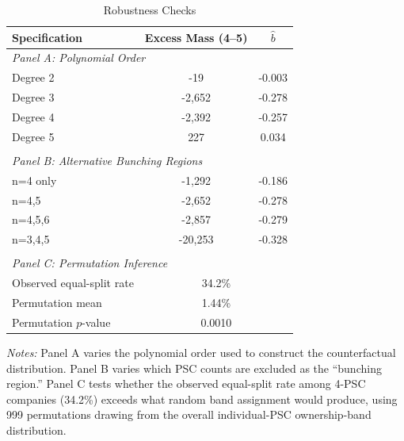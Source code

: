 \begin{table}[t]
\centering
\begin{threeparttable}
\caption{Robustness Checks}
\label{tab:robust}
\begin{tabular}{lcc}
\toprule
Specification & Excess Mass (4--5) & $\hat{b}$ \\
\midrule
\multicolumn{3}{l}{\textit{Panel A: Polynomial Order}} \\[3pt]
\quad Degree 2 & -19 & -0.003 \\
\quad Degree 3 & -2,652 & -0.278 \\
\quad Degree 4 & -2,392 & -0.257 \\
\quad Degree 5 & 227 & 0.034 \\
\\
\multicolumn{3}{l}{\textit{Panel B: Alternative Bunching Regions}} \\[3pt]
\quad n=4 only & -1,292 & -0.186 \\
\quad n=4,5 & -2,652 & -0.278 \\
\quad n=4,5,6 & -2,857 & -0.279 \\
\quad n=3,4,5 & -20,253 & -0.328 \\
\\
\multicolumn{3}{l}{\textit{Panel C: Permutation Inference}} \\[3pt]
\quad Observed equal-split rate & \multicolumn{2}{c}{34.2\%} \\
\quad Permutation mean & \multicolumn{2}{c}{1.44\%} \\
\quad Permutation $p$-value & \multicolumn{2}{c}{0.0010} \\
\bottomrule
\end{tabular}
\begin{tablenotes}[flushleft]\small
\item \textit{Notes:} Panel A varies the polynomial order used to construct the counterfactual distribution. Panel B varies which PSC counts are excluded as the ``bunching region.'' Panel C tests whether the observed equal-split rate among 4-PSC companies (34.2\%) exceeds what random band assignment would produce, using 999 permutations drawing from the overall individual-PSC ownership-band distribution.
\end{tablenotes}
\end{threeparttable}
\end{table}
